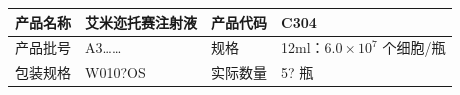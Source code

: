 \documentclass[UTF8,10pt,a4paper,fontset=fandol]{ctexart}
\newcommand{\fieldvalue}[1]{#1}
\newcommand{\handwritten}[1]{#1}
\begin{document}
\begin{tabular}{|p{2.2cm}|p{4.3cm}|p{2.2cm}|p{2.2cm}|}
\hline
产品名称 &
\fieldvalue{艾米迩托赛注射液} &
产品代码 &
\fieldvalue{C304}
\\ \hline
产品批号 &
\fieldvalue{\handwritten{A3……}} &
规格 &
12ml：$6.0 \times 10^{7}$ 个细胞/瓶
\\ \hline
包装规格 &
\fieldvalue{\handwritten{W010?OS}} &
实际数量 &
\fieldvalue{\handwritten{5?}} 瓶
\\ \hline
\end{tabular}

\vspace{4pt}
\end{document}
